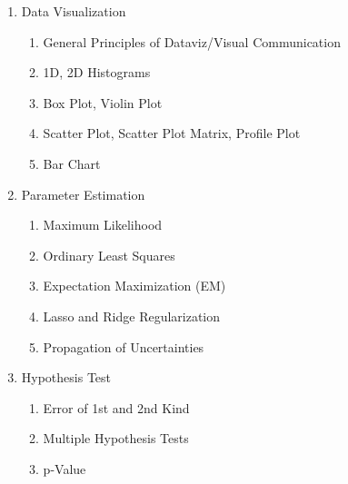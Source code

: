 \documentclass[8pt]{extarticle}
\begin{document}
\begin{enumerate}
    \item Data Visualization
          \begin{enumerate}[label*=\arabic*.]
              \item General Principles of Dataviz/Visual Communication
              \item 1D, 2D Histograms
              \item Box Plot, Violin Plot
              \item Scatter Plot, Scatter Plot Matrix, Profile Plot
              \item Bar Chart
          \end{enumerate}
    \item Parameter Estimation
          \begin{enumerate}[label*=\arabic*.]
              \item Maximum Likelihood
              \item Ordinary Least Squares
              \item Expectation Maximization (EM)
              \item Lasso and Ridge Regularization
              \item Propagation of Uncertainties
          \end{enumerate}
    \item Hypothesis Test
          \begin{enumerate}[label*=\arabic*.]
              \item Error of 1st and 2nd Kind
              \item Multiple Hypothesis Tests
              \item p-Value
          \end{enumerate}
\end{enumerate}
\end{document}
